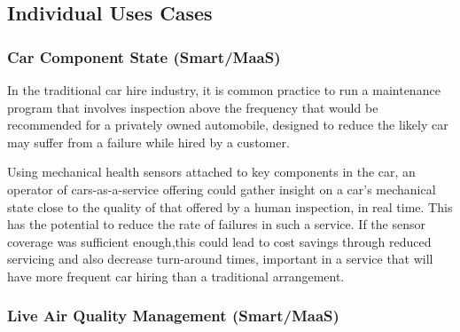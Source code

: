 \documentclass[journal]{IEEEtran}
\begin{document}

\subsection{Individual Uses Cases}

\subsubsection{Car Component State (Smart/MaaS)}

In the traditional car hire industry, it is common practice to run a
maintenance program that involves inspection above the frequency that
would be recommended for a privately owned automobile, designed to
reduce the likely car may suffer from a failure while hired by a
customer.

Using mechanical health sensors attached to key components in the car,
an operator of cars-as-a-service offering could gather insight on a
car's mechanical state close to the quality of that offered by a human
inspection, in real time. This has the potential to reduce the rate of
failures in such a service. If the sensor coverage was sufficient
enough,this could lead to cost savings through reduced servicing and
also decrease turn-around times, important in a service that will have
more frequent car hiring than a traditional arrangement.

\subsubsection{Live Air Quality Management (Smart/MaaS)}
\end{document}
